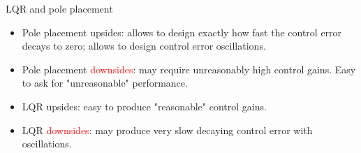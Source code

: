 \documentclass{beamer}
\begin{document}
\begin{frame}{LQR and pole placement}
	\begin{flushleft}
		
		\begin{itemize}
			\item Pole placement \textcolor{mydarkgreen}{upsides}: allows to design exactly how fast the control error decays to zero; allows to design control error oscillations.
			
			\item Pole placement \textcolor{red}{downsides}: may require unreasonably high control gains. Easy to ask for "unreasonable" performance.
			
			\item LQR \textcolor{mydarkgreen}{upsides}: easy to produce "reasonable" control gains.
			
			\item LQR \textcolor{red}{downsides}: may produce very slow decaying control error with oscillations.
		\end{itemize}
		
		
	\end{flushleft}
\end{frame}


\myqrframe
\end{document}
